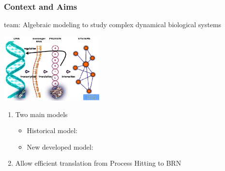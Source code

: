 
\begin{frame}[c]
  \frametitle{Context and Aims}


 team: Algebraic modeling to study complex dynamical biological systems

\begin{center}
  \includegraphics[height=3.5cm]{figs/dnascheme_white.png}
\end{center}

\pause
\begin{enumerate}[1)]
  \item Two main models
  \begin{itemize}
    \item Historical model: 
    \item New developed model: 
  \end{itemize}

\medskip
  \item Allow efficient translation from Process Hitting to BRN
\end{enumerate}

\end{frame}
